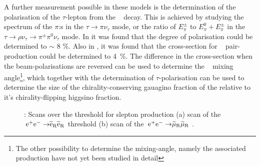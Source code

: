 A further measurement possible in these models is the determination of the
polarisation of the $\tau$-lepton from the \stone~ decay.
This is achieved by studying the spectrum of the $\pi$:s in
the $\tau \rightarrow \pi \nu_\tau$ mode, or the ratio of
$E_\pi^\pm$ to $E_\pi^0 + E_\pi^\pm$ in the  $\tau \rightarrow \rho \nu_\tau \rightarrow \pi^\pm \pi^0 \nu_\tau $ mode.
In \cite{Bechtle:2009em} it was found that
the degree of polarisation could be determined to $\sim$ 8 \%.
Also in \cite{Bechtle:2009em},
it was found that the cross-section for \stone~ pair-production could be determined to 4~\%.
The difference in the cross-section when the beam-polarisations are
reversed can be used to determine the \stau~ mixing angle\footnote{The other
possibility to determine the mixing-angle, namely the \stone \sttwo associated production
have not yet been studied in detail},
which together with the determination of $\tau$-polarisation can be used to determine
the size of the chirality-conserving gauagino fraction of the  relative to it's
chirality-flipping higgsino fraction.
\begin{figure}[]
  \begin{center}
    \hspace{0.01\linewidth}
  \end{center}
  \caption{\label{fig:searches_smuselthreshold} : Scans over the threshold for slepton production
(a) scan of the $\mbox{$ {\, \mathrm e}^+ {\mathrm e}^- \to $} \mbox{$ \widetilde{\mathrm e}_{\mathrm R} $} \mbox{$ \widetilde{\mathrm e}_{\mathrm R} $}$ threshold  (b)  scan of the $\mbox{$ {\, \mathrm e}^+ {\mathrm e}^- \to $} \mbox{$ \widetilde{\mu}_{\mathrm R} $} \mbox{$ \widetilde{\mu}_{\mathrm R} $}$ \cite{Berggren:2015qua}. }
\end{figure}

